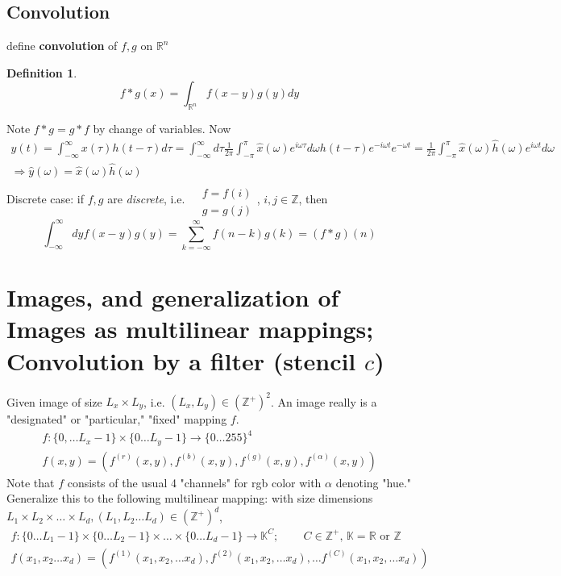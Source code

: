 \documentclass[10pt]{amsart}
\newtheorem{definition}{Definition}
\begin{document}
\begin{multicols*}{2}
\subsection*{Convolution}
define \textbf{convolution} of $f,g$ on $\mathbb{R}^n$
\begin{definition}
	\begin{equation}  f* g(x) = \int_{ \mathbb{R}^n } f(x-y)g(y)dy \end{equation}
\end{definition}
Note $f*g = g*f$ by change of variables.  
Now
\[
\begin{gathered}
y(t) = \int_{-\infty}^{\infty}x(\tau)h(t-\tau)d\tau = \int_{-\infty}^{\infty} d\tau \frac{1}{2\pi} \int_{-\pi}^{\pi} \widehat{x}(\omega) e^{i\omega \tau} d\omega h(t-\tau) e^{-i \omega t} e^{-\omega t} = \frac{1}{2\pi} \int_{-\pi}^{\pi} \widehat{x}(\omega) \widehat{h}(\omega) e^{i\omega t} d\omega \\ 
\Longrightarrow \widehat{y}(\omega) = \widehat{x}(\omega) \widehat{h}(\omega)
\end{gathered}
\]
Discrete case: if $f,g$ are \emph{discrete}, i.e. $\begin{aligned} & \quad \\
& f = f(i) \\
& g = g(j) \end{aligned}$, $i,j \in \mathbb{Z}$, then
\[
\int_{-\infty}^{\infty} dy f(x-y)g(y) = \sum_{k=-\infty}^{\infty} f(n-k) g(k) = (f*g)(n)
\]
\section{Images, and generalization of Images as multilinear mappings; Convolution by a filter (stencil $c$)}
Given image of size $L_x \times L_y$, i.e. $(L_x,L_y)\in ( \mathbb{Z}^+)^2$.  An image really is a "designated" or "particular," "fixed" mapping $f$.  
\[
\begin{gathered}
f: \lbrace 0 , \dots L_x- 1\rbrace \times \lbrace 0 \dots L_y-1 \rbrace \to \lbrace 0 \dots 255 \rbrace^4 \\ 
f(x,y) = (f^{(r)}(x,y), f^{(b)}(x,y), f^{(g)}(x,y), f^{(\alpha)}(x,y))
\end{gathered}
\]
Note that $f$ consists of the usual 4 "channels" for rgb color with $\alpha$ denoting "hue."  
Generalize this to the following multilinear mapping:  
with size dimensions $L_1 \times L_2 \times \dots \times L_d, (L_1, L_2 \dots L_d)\in (\mathbb{Z}^+)^d$, 
\begin{equation}
\begin{gathered}
f: \lbrace 0 \dots L_1 - 1 \rbrace \times  \lbrace 0 \dots L_2 - 1 \rbrace \times \dots \times  \lbrace 0 \dots L_d - 1 \rbrace \to \mathbb{K}^C ; \qquad \, C\in \mathbb{Z}^+ , \, \mathbb{K} = \mathbb{R} \text{ or } \mathbb{Z} \\ 
f(x_1,x_2 \dots x_d) = (f^{(1)}(x_1,x_2,\dots x_d), f^{(2)}(x_1,x_2,\dots x_d), \dots f^{(C)}(x_1,x_2,\dots x_d) )
\end{gathered}
\end{equation}

\end{multicols*}
\end{document}
